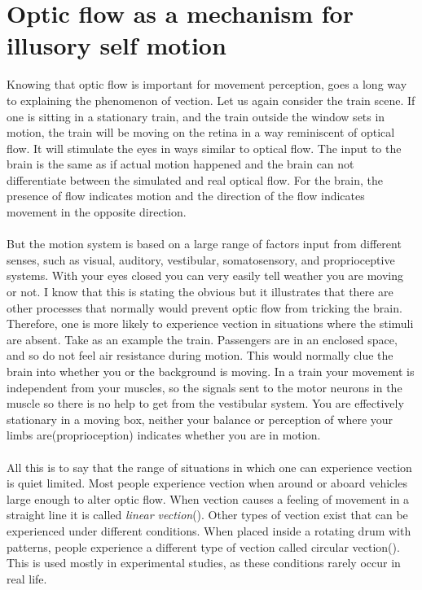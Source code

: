 \documentclass[11pt,a4paper,oneside,table,xcdraw]{article}
\begin{document}
\section{Optic flow as a mechanism for illusory self motion}
Knowing that optic flow is important for movement perception, goes a long way to explaining the phenomenon of vection. Let us again consider the train scene. If one is sitting in a stationary train, and the train outside the window sets in motion, the train will be moving on the retina in a way reminiscent of optical flow. It will stimulate the eyes in ways similar to optical flow. The input to the brain is the same as if actual motion happened and the brain can not differentiate between the simulated and real optical flow. For the brain, the presence of flow indicates motion and the direction of the flow indicates movement in the opposite direction.\\\\
But the motion system is based on a large range of factors input from different senses, such as visual, auditory, vestibular, somatosensory, and proprioceptive systems\cite{wind}. With your eyes closed you can very easily tell weather you are moving or not. I know that this is stating the obvious but it illustrates that there are other processes that normally would prevent optic flow from tricking the brain. Therefore, one is more likely to experience vection in situations where the stimuli are absent. Take as an example the train. Passengers are in an enclosed space, and so do not feel air resistance during motion. This would normally clue the brain into whether you or the background is moving. In a train your movement is independent from your muscles, so the signals sent to the motor neurons in the muscle so there is no help to get from the vestibular system. You are effectively stationary in a moving box, neither your balance or perception of where your limbs are(proprioception) indicates whether you are in motion.\\\\
All this is to say that the range of situations in which one can experience vection is quiet limited. Most people experience vection when around or aboard vehicles large enough to alter optic flow. When vection causes a feeling of movement in a straight line it is called \textit{linear vection}(\cite{vectionlinear}). Other types of vection exist that can be experienced under different conditions. When placed inside a rotating drum with patterns, people experience a different type of vection called circular vection(\cite{}). This is used mostly in experimental studies, as these conditions rarely occur in real life.
\end{document}
